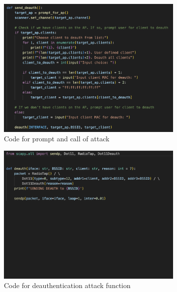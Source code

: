 \begin{figure}[!htbp]
     \centering
     \begin{subfigure}{0.49\textwidth}
         \centering
         \includegraphics[width=\textwidth]{Latex-Files/Billeder/Implementation/deauth_prompt_code.png}
         \caption{Code for prompt and call of attack}
         \label{deauth_prompt_code}
     \end{subfigure}
     \hfill
     \begin{subfigure}{0.49\textwidth}
         \centering
         \includegraphics[width=\textwidth]{Latex-Files/Billeder/Implementation/deauth_func_code.png}
         \caption{Code for deauthentication attack function}
         \label{deauth_func_code}
     \end{subfigure}
     \hfill
     \caption{}
\end{figure}

